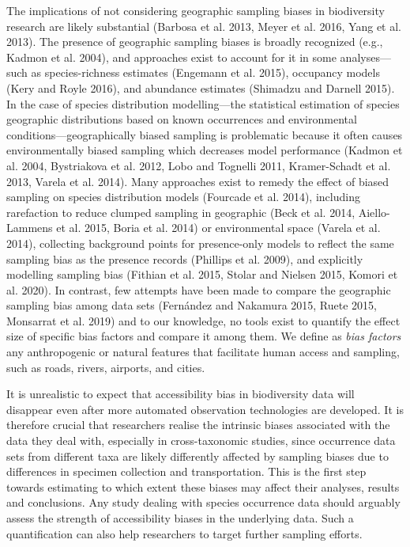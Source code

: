 \documentclass[
  12pt,
]{article}
\begin{document}
The implications of not considering geographic sampling biases in biodiversity research are likely substantial (Barbosa et al. 2013, Meyer et al. 2016, Yang et al. 2013). The presence of geographic sampling biases is broadly recognized (e.g., Kadmon et al. 2004), and approaches exist to account for it in some analyses---such as species-richness estimates (Engemann et al. 2015), occupancy models (Kery and Royle 2016), and abundance estimates (Shimadzu and Darnell 2015). In the case of species distribution modelling---the statistical estimation of species geographic distributions based on known occurrences and environmental conditions---geographically biased sampling is problematic because it often causes environmentally biased sampling which decreases model performance (Kadmon et al. 2004, Bystriakova et al. 2012, Lobo and Tognelli 2011, Kramer-Schadt et al. 2013, Varela et al. 2014). Many approaches exist to remedy the effect of biased sampling on species distribution models (Fourcade et al. 2014), including rarefaction to reduce clumped sampling in geographic (Beck et al. 2014, Aiello-Lammens et al. 2015, Boria et al. 2014) or environmental space (Varela et al. 2014), collecting background points for presence-only models to reflect the same sampling bias as the presence records (Phillips et al. 2009), and explicitly modelling sampling bias (Fithian et al. 2015, Stolar and Nielsen 2015, Komori et al. 2020). In contrast, few attempts have been made to compare the geographic sampling bias among data sets (Fernández and Nakamura 2015, Ruete 2015, Monsarrat et al. 2019) and to our knowledge, no tools exist to quantify the effect size of specific bias factors and compare it among them. We define as \textit{bias factors} any anthropogenic or natural features that facilitate human access and sampling, such as roads, rivers, airports, and cities.

It is unrealistic to expect that accessibility bias in biodiversity data will disappear even after more automated observation technologies are developed. It is therefore crucial that researchers realise the intrinsic biases associated with the data they deal with, especially in cross-taxonomic studies, since occurrence data sets from different taxa are likely differently affected by sampling biases due to differences in specimen collection and transportation. This is the first step towards estimating to which extent these biases may affect their analyses, results and conclusions. Any study dealing with species occurrence data should arguably assess the strength of accessibility biases in the underlying data. Such a quantification can also help researchers to target further sampling efforts.
\end{document}
